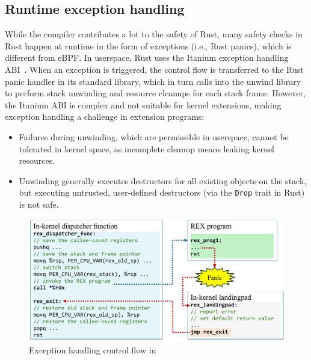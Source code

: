 \subsection{Runtime exception handling}
\label{principle:eh}
While the compiler contributes a lot to the safety of Rust, many safety checks
    in Rust happen at runtime in the form of exceptions (i.e., Rust panics),
    which is different from eBPF.
In userspace, Rust uses the Itanium exception handling ABI~\cite{itanium-abi}.
When an exception is triggered, the control flow is transferred to the Rust
    panic handler in its standard library, which in turn calls into the unwind
    library to perform stack unwinding and resource cleanups for each stack
    frame.
However, the Itanium ABI is complex and not suitable for kernel extensions,
    making exception handling a challenge in \projname{} extension programs:
\begin{itemize}
    \item Failures during unwinding, which are permissible in userspace, cannot
        be tolerated in kernel space, as incomplete cleanup means leaking
        kernel resources.
    \item Unwinding generally executes destructors for all existing objects on
        the stack, but executing untrusted, user-defined destructors (via the
        \texttt{\small Drop} trait in Rust) is not safe.
\end{itemize}

\begin{figure}
    \includegraphics[width=1.0\linewidth]{figs/exception_handling.pdf}
    \centering
    \vspace{-10pt}
    \caption{Exception handling control flow in \projname{}}
    \label{fig:eh-overview}
    \vspace{-10pt}
\end{figure}

